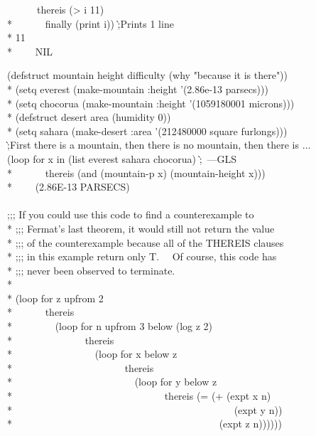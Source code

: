\begin{defloop}
\begin{lisp}
~~~~~~thereis (> i 11) \\*
~~~~~~finally (print i)) \`;\textrm{Prints 1 line}\\*
11 \\*
~~~\EV~NIL
\end{lisp}
\goodbreak
\begin{lisp}
(defstruct mountain height difficulty (why "because it is there")) \\*
(setq everest (make-mountain :height '(2.86e-13 parsecs))) \\*
(setq chocorua (make-mountain :height '(1059180001 microns))) \\*
(defstruct desert area (humidity 0)) \\*
(setq sahara (make-desert :area '(212480000 square furlongs))) \\
\`;\textrm{First there is a mountain, then there is no mountain, then there is $\ldots$} \\
(loop for x in (list everest sahara chocorua) \`;~\textrm{---GLS} \\*
~~~~~~thereis (and (mountain-p x) (mountain-height x))) \\*
~~~\EV~(2.86E-13 PARSECS) \\
 \\
;;; If you could use this code to find a counterexample to \\*
;;; Fermat's last theorem, it would still not return the value \\*
;;; of the counterexample because all of the THEREIS clauses \\*
;;; in this example return only T.~~ Of course, this code has \\*
;;; never been observed to terminate. \\*
 \\*
(loop for z upfrom 2 \\*
~~~~~~thereis \\*
~~~~~~~~(loop for n upfrom 3 below (log z 2) \\*
~~~~~~~~~~~~~~thereis \\*
~~~~~~~~~~~~~~~~(loop for x below z \\*
~~~~~~~~~~~~~~~~~~~~~~thereis \\*
~~~~~~~~~~~~~~~~~~~~~~~~(loop for y below z \\*
~~~~~~~~~~~~~~~~~~~~~~~~~~~~~~thereis (= (+ (expt x n) \\*
~~~~~~~~~~~~~~~~~~~~~~~~~~~~~~~~~~~~~~~~~~~~(expt y n)) \\*
~~~~~~~~~~~~~~~~~~~~~~~~~~~~~~~~~~~~~~~~~(expt z n))))))
\end{lisp}
\end{defloop}

